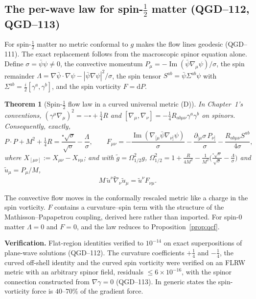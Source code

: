 \documentclass[11pt,a4paper]{article}
\newtheorem{theorem}{Theorem}[section]
\begin{document}
\subsection{The per-wave law for spin-$\frac12$ matter (QGD--112, QGD--113)}\label{sec:spinhalf}
For spin-$\frac12$ matter no metric conformal to $g$ makes the flow lines geodesic
(QGD--111). The exact replacement follows from the macroscopic spinor equation
alone. Define $\sigma=\bar\psi\psi\neq0$, the convective momentum
$P_\mu=-\operatorname{Im}(\bar\psi\nabla_\mu\psi)/\sigma$, the spin remainder
$\Lambda=\nabla\bar\psi\cdot\nabla\psi-|\bar\psi\nabla\psi|^2/\sigma$, the spin tensor
$S^{ab}=\bar\psi\Sigma^{ab}\psi$ with $\Sigma^{ab}=\frac i2[\gamma^a,\gamma^b]$, and the spin
vorticity $F=\mathrm dP$.
\begin{theorem}[Spin-$\tfrac12$ flow law in a curved universal metric (D)]\label{thm:spinhalf}
In Chapter~1's conventions, $(\gamma^\mu\nabla_\mu)^2=-\square+\frac14R$ and
$[\nabla_\mu,\nabla_\nu]=-\frac14R_{ab\mu\nu}\gamma^a\gamma^b$ on spinors. Consequently, exactly,
\begin{equation}\label{eq:spinhalfflow}
P\cdot P+M^2+\tfrac14R=\frac{\square\sqrt\sigma}{\sqrt\sigma}-\frac\Lambda\sigma,\qquad
F_{\mu\nu}=-\frac{\operatorname{Im}(\nabla_{[\mu}\bar\psi\nabla_{\nu]}\psi)}{\sigma}
-\frac{\partial_{[\mu}\sigma\,P_{\nu]}}{\sigma}-\frac{R_{ab\mu\nu}S^{ab}}{4\sigma},
\end{equation}
where $X_{[\mu\nu]}:=X_{\mu\nu}-X_{\nu\mu}$; and with $\tilde g=\Omega_{1/2}^2g$,
$\Omega_{1/2}^2=1+\frac{R}{4M^2}-\frac1{M^2}\bigl(\frac{\square\sqrt\sigma}{\sqrt\sigma}-\frac\Lambda\sigma\bigr)$
and $\tilde u_\mu=P_\mu/M$,
\begin{equation}\label{eq:spinhalflorentz}
\boxed{M\,\tilde u^\nu\tilde\nabla_\nu\tilde u_\mu=\tilde u^\nu F_{\nu\mu}.}
\end{equation}
\end{theorem}
\noindent The convective flow moves in the conformally rescaled metric like a
charge in the spin vorticity. $F$ contains a curvature--spin term with the
structure of the Mathisson--Papapetrou coupling, derived here rather than
imported. For spin-0 matter $\Lambda=0$ and $F=0$, and the law reduces to
Proposition~\ref{prop:qcf}.

\noindent\textbf{Verification.} Flat-region identities verified to $10^{-14}$ on exact
superpositions of plane-wave solutions (QGD--112). The curvature coefficients $+\frac14$
and $-\frac14$, the curved off-shell identity and the curved spin vorticity were verified
on an FLRW metric with an arbitrary spinor field, residuals $\le6\times10^{-16}$, with
the spinor connection constructed from $\nabla\gamma=0$ (QGD--113). In generic states the
spin-vorticity force is $40$--$70\%$ of the gradient force.
\end{document}
